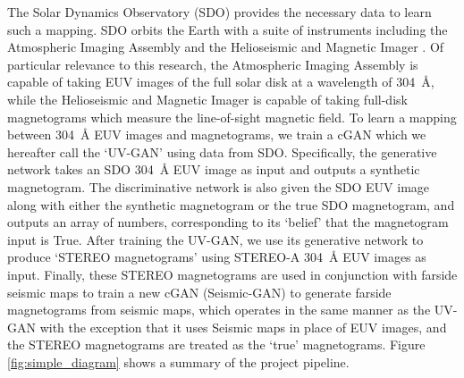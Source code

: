 \documentclass[11pt,a4paper,onecolumn]{report}
\begin{document}
The Solar Dynamics Observatory (SDO) \citep{pesnell_solar_2012} provides the
necessary data to learn such a mapping. SDO orbits the Earth with a suite of
instruments including the Atmospheric Imaging Assembly
\citep{lemen_atmospheric_2012} and the Helioseismic and Magnetic Imager
\citep{scherrer_helioseismic_2012}. Of particular relevance to this research,
the Atmospheric Imaging Assembly is capable of taking EUV images of the full
solar disk at a wavelength of \SI{304}{\angstrom}, while the Helioseismic and
Magnetic Imager is capable of taking full-disk magnetograms which measure the
line-of-sight magnetic field. To learn a mapping between \SI{304}{\angstrom} EUV
images and magnetograms, we train a cGAN which we hereafter call the `UV-GAN'
using data from SDO. Specifically, the generative network takes an SDO
\SI{304}{\angstrom} EUV image as input and outputs a synthetic magnetogram. The
discriminative network is also given the SDO EUV image along with either the
synthetic magnetogram or the true SDO magnetogram, and outputs an array of
numbers, corresponding to its `belief' that the magnetogram input is True.
After training the UV-GAN, we use its generative network to produce `STEREO
magnetograms' using STEREO-A \SI{304}{\angstrom} EUV images as input. Finally,
these STEREO magnetograms are used in conjunction with farside seismic maps to
train a new cGAN (Seismic-GAN) to generate farside magnetograms from seismic
maps, which operates in the same manner as the UV-GAN with the exception that
it uses Seismic maps in place of EUV images, and the STEREO magnetograms are
treated as the `true' magnetograms. Figure \ref{fig:simple_diagram} shows a
summary of the project pipeline. \\
\end{document}
